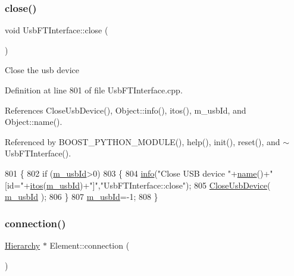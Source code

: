 \subsubsection{\texorpdfstring{close()}{close()}}
{\footnotesize\ttfamily void Usb\+F\+T\+Interface\+::close (\begin{DoxyParamCaption}{ }\end{DoxyParamCaption})}

Close the usb device 

Definition at line 801 of file Usb\+F\+T\+Interface.\+cpp.



References Close\+Usb\+Device(), Object\+::info(), itos(), m\+\_\+usb\+Id, and Object\+::name().



Referenced by B\+O\+O\+S\+T\+\_\+\+P\+Y\+T\+H\+O\+N\+\_\+\+M\+O\+D\+U\+L\+E(), help(), init(), reset(), and $\sim$\+Usb\+F\+T\+Interface().


\begin{DoxyCode}
801                              \{
802   \textcolor{keywordflow}{if} (\hyperlink{classUsbFTInterface_a91df5c0547e8be460bc087e27afe05aa}{m\_usbId}>0)
803   \{    
804     \hyperlink{classObject_a644fd329ea4cb85f54fa6846484b84a8}{info}(\textcolor{stringliteral}{"Close USB device "}+\hyperlink{classObject_a300f4c05dd468c7bb8b3c968868443c1}{name}()+\textcolor{stringliteral}{" [id="}+\hyperlink{Tools_8h_af330027dbdafb9a30768b3613c553e60}{itos}(\hyperlink{classUsbFTInterface_a91df5c0547e8be460bc087e27afe05aa}{m\_usbId})+\textcolor{stringliteral}{"]"},\textcolor{stringliteral}{"UsbFTInterface::close"});
805     \hyperlink{LALUsbML_8h_a3f0a3f9e09951c39ae1df0638008875a}{CloseUsbDevice}( \hyperlink{classUsbFTInterface_a91df5c0547e8be460bc087e27afe05aa}{m\_usbId} );
806   \}
807   \hyperlink{classUsbFTInterface_a91df5c0547e8be460bc087e27afe05aa}{m\_usbId}=-1;
808 \}
\end{DoxyCode}
\mbox{\label{classElement_af57444353c1ddf9fa0109801e97debf7}} 
\subsubsection{\texorpdfstring{connection()}{connection()}}
{\footnotesize\ttfamily \hyperlink{classHierarchy}{Hierarchy} $\ast$ Element\+::connection (\begin{DoxyParamCaption}{ }\end{DoxyParamCaption})\hspace{0.3cm}{\ttfamily [inherited]}}

